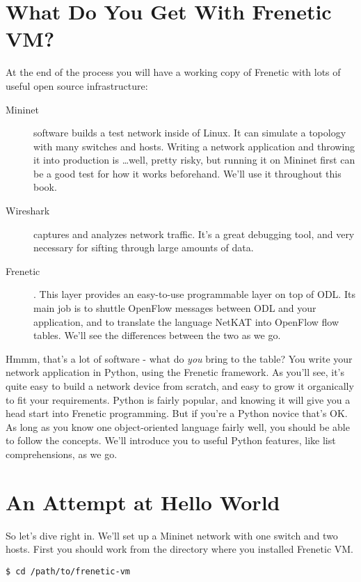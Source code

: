\section{What Do You Get With Frenetic VM?}

At the end of the process you will have a working copy of Frenetic with lots of useful open source infrastructure:

\begin{description}
\item[Mininet] software builds a test network inside of Linux.  
It can simulate a topology with many switches and hosts.  
Writing a network application and throwing it into production is \ldots well, pretty risky, but running it on Mininet first can be a good test for how it works beforehand.  
We'll use it throughout this book.  
\item[Wireshark] captures and analyzes network traffic.  
It's a great debugging tool, and very necessary for sifting through large amounts of data.
\item[Frenetic].  This layer provides an easy-to-use programmable layer on top of ODL.  Its main job is to shuttle OpenFlow messages between ODL and your application, and to translate the language NetKAT into OpenFlow flow tables.  We'll see the differences between the two as we go.
\end{description}

Hmmm, that's a lot of software - what do {\it you} bring to the table?  You write your network application in Python, using the Frenetic framework.  As you'll see, it's quite easy to build a network device from scratch, and easy to grow it organically to fit your requirements.  Python is fairly popular, and knowing it will give you  a head start into Frenetic programming.  But if you're a Python novice that's OK.  As long as you know one object-oriented language fairly well, you should be able to follow the concepts.  We'll introduce you to useful Python features, like list comprehensions, as we go.  

\section{An Attempt at Hello World}

So let's dive right in.  We'll set up a Mininet network with one switch and two hosts.  First you should work from the directory where you installed Frenetic VM.

\begin{lstlisting}[style=BashInputStyle]
 $ cd /path/to/frenetic-vm
\end{lstlisting}
 
